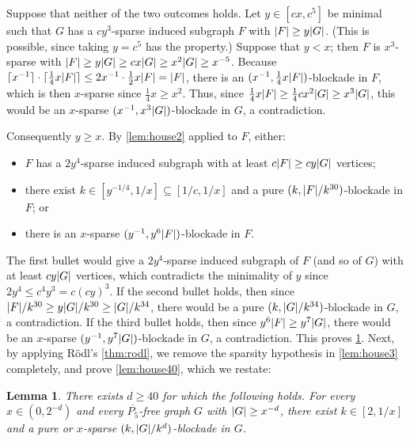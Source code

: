 \documentclass[11pt,reqno,a4paper]{amsart}
\newtheorem{lemma}[theorem]{Lemma}
\let\oldendproof\endproof
\renewenvironment{proof}[1][\proofname]{%
	\oldproof[\normalfont\bfseries #1]%
}{\oldendproof}
\renewcommand{\subset}{\subseteq}
\DeclarePairedDelimiter\abs{\lvert}{\rvert}%
\DeclarePairedDelimiter\ceil{\lceil}{\rceil}%
\begin{document}
	\begin{proof}
		Suppose that neither of the two outcomes holds.
		Let $y\in[cx,c^5]$ be minimal such that $G$ has a $cy^3$-sparse induced subgraph $F$ with $\abs F\ge y\abs G$. (This is possible, since taking $y=c^5$ has the property.)
		Suppose that $y<x$; then $F$ is $x^3$-sparse with $\abs F\ge y\abs G\ge cx\abs G\ge x^2\abs G\ge x^{-5}$.
		Because $\ceil{x^{-1}}\cdot\ceil{\frac14x\abs F}\le 2x^{-1}\cdot \frac12x\abs F=\abs F$,
		there is an $(x^{-1},\frac14x\abs F)$-blockade in $F$,
		which is then $x$-sparse since $\frac14x\ge x^2$.
		Thus, since $\frac14x\abs F\ge \frac14 cx^2\abs G\ge x^3\abs G$, this would be an $x$-sparse $(x^{-1},x^3\abs G)$-blockade in $G$, a contradiction.
		
		Consequently $y\ge x$. 
		By \cref{lem:house2} applied to $F$, either:
		\begin{itemize}
			\item $F$ has a $2y^4$-sparse induced subgraph with at least $c\abs F\ge cy\abs G$ vertices;
			
			\item there exist $k\in[y^{-1/4},1/x]\subset[1/c,1/x]$ and a pure $(k,\abs F/k^{30})$-blockade in $F$; or
			
			\item there is an $x$-sparse $(y^{-1},{y^6\abs F})$-blockade in $F$.
		\end{itemize}
		The first bullet would give a $2y^4$-sparse induced subgraph of $F$ (and so of $G$) with at least $cy\abs G$ vertices,
		which contradicts the minimality of $y$ since $2y^4\le c^4y^3= c(cy)^3$.
		If the second bullet holds, then since $\abs F/k^{30}\ge y\abs G/k^{30}\ge \abs G/k^{34}$, there would be a pure $(k,\abs G/k^{34})$-blockade in $G$, a contradiction.
		If the third bullet holds, then since $y^6\abs F\ge y^7\abs G$,
		there would be an $x$-sparse $(y^{-1},{y^7\abs G})$-blockade in $G$, a contradiction.
		This proves \cref{lem:house4}.
	\end{proof}
	Next, by applying  R\"odl's \cref{thm:rodl}, we remove the sparsity hypothesis in \cref{lem:house3} completely, and prove \cref{lem:house40}, which we restate:
	\begin{lemma}
		\label{lem:house4}
		There exists $d\ge40$ for which the following holds.
		For every $x\in(0,2^{-d})$ and every $\overline{P_5}$-free graph $G$ with $\abs G\ge x^{-d}$, there exist $k\in[2,1/x]$ and a pure or $x$-sparse $(k,\abs G/k^d)$-blockade in $G$.
	\end{lemma}
\end{document}
